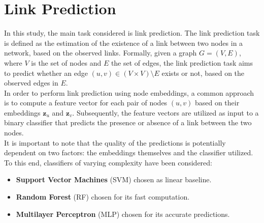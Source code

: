 \section{Link Prediction} \label{sec:linkprediction}
In this study, the main task considered is link prediction.
The link prediction task is defined as the estimation of the existence of a link between two nodes in a network, based on the observed links.
Formally, given a graph \(G=(V,E)\), where \(V\) is the set of nodes and \(E\) the set of edges, the link prediction task aims to predict whether an edge \((u,v) \in (V \times V) \setminus E\) exists or not, based on the observed edges in \(E\).
\\\newline
In order to perform link prediction using node embeddings, a common approach is to compute a feature vector for each pair of nodes \((u,v)\) based on their embeddings \(\mathbf{z}_u\) and \(\mathbf{z}_v\).
Subsequently, the feature vectors are utilized as input to a binary classifier that predicts the presence or absence of a link between the two nodes. 
\\\newline
It is important to note that the quality of the predictions is potentially dependent on two factors: the embeddings themselves and the classifier utilized. 
To this end, classifiers of varying complexity have been considered:
\begin{itemize}
    \item \textbf{Support Vector Machines} (SVM) \cite{SVM} chosen as linear baseline. 
    \item \textbf{Random Forest} (RF) \cite{RandomForest} chosen for its fast computation.
    \item \textbf{Multilayer Perceptron} (MLP) \cite{MLP} chosen for its accurate predictions.
\end{itemize}